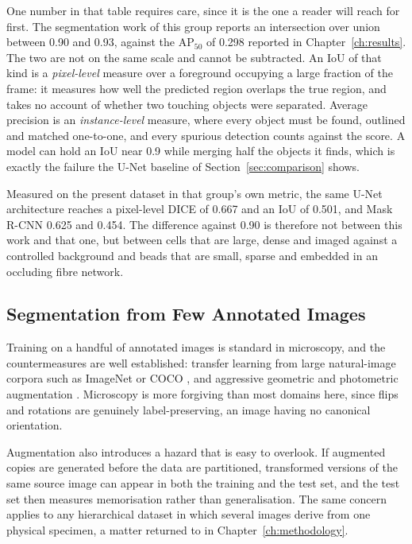 One number in that table requires care, since it is the one a reader will reach
for first. The segmentation work of this group reports an intersection over union
between 0.90 and 0.93, against the $\mathrm{AP}_{50}$ of 0.298 reported in
Chapter~\ref{ch:results}. The two are not on the same scale and cannot be
subtracted. An IoU of that kind is a \emph{pixel-level} measure over a foreground
occupying a large fraction of the frame: it measures how well the predicted
region overlaps the true region, and takes no account of whether two touching
objects were separated. Average precision is an \emph{instance-level} measure, where every
object must be found, outlined and matched one-to-one, and every spurious
detection counts against the score. A model can hold an IoU near 0.9 while merging
half the objects it finds, which is exactly the failure the U-Net baseline of
Section~\ref{sec:comparison} shows.

Measured on the present dataset in that group's own metric, the same U-Net
architecture reaches a pixel-level DICE of 0.667 and an IoU of 0.501, and Mask
R-CNN 0.625 and 0.454. The difference against 0.90 is therefore not between this work and
that one, but between cells that are large, dense and imaged against a controlled
background and beads that are small, sparse and embedded in an occluding fibre
network.

\subsection{Segmentation from Few Annotated Images}

Training on a handful of annotated images is standard in microscopy, and the
countermeasures are well established: transfer learning from large natural-image
corpora such as ImageNet \cite{deng2009imagenet} or COCO \cite{lin2014microsoft},
and aggressive geometric and photometric augmentation \cite{shorten2019survey}.
Microscopy is more forgiving than most domains here, since flips and rotations are
genuinely label-preserving, an image having no canonical orientation.

Augmentation also introduces a hazard that is easy to overlook. If augmented
copies are generated before the data are partitioned, transformed versions of the
same source image can appear in both the training and the test set, and the test
set then measures memorisation rather than generalisation. The same concern
applies to any hierarchical dataset in which several images derive from one
physical specimen, a matter returned to in Chapter~\ref{ch:methodology}.



